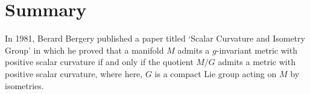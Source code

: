 \chapter*{Summary}
\label{ch:summary}

In 1981, Berard Bergery published a paper titled `Scalar Curvature and Isometry Group' in which he proved that a manifold $M$ admits a $g$-invariant metric with positive scalar curvature if and only if the quotient $M/G$ admits a metric with positive scalar curvature, where here, $G$ is a compact Lie group acting on $M$ by isometries.
